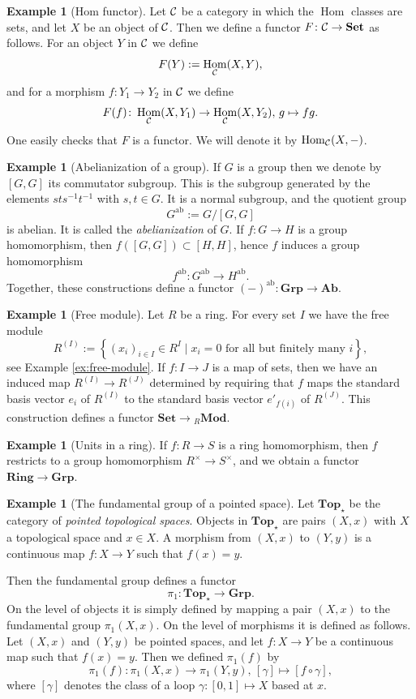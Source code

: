 \documentclass[11pt]{amsbook}
\renewcommand{\ast}{\star}
\DeclareMathOperator\Hom{Hom}
\DeclareMathOperator\Mod{{\bf{Mod}}}
\def\ab{\mathrm{ab}}
\def\Set{\mathbf{Set}}
\def\Ab{\mathbf{Ab}}
\def\Top{\mathbf{Top}}
\def\Grp{\mathbf{Grp}}
\def\Ring{\mathbf{Ring}}
\def\Mod{\mathbf{Mod}}
\theoremstyle{plain}
\theoremstyle{definition}
\newtheorem{example}[theorem]{Example}
\begin{document}
\begin{example}[Hom functor]\label{exa:covariant-hom-functor}
Let ${\mathcal{C}}$ be a category in which the $\Hom$ classes are sets, and let $X$ be an object of ${\mathcal{C}}$. Then we define a functor $F\colon \cC\to \Set$ as follows. For an object $Y$ in ${\mathcal{C}}$ we define
\[
	F(Y) := \Hom_\cC(X,Y),
\]
and for a morphism $f\colon Y_1 \to Y_2$ in ${\mathcal{C}}$ we define
\[
	F(f) \colon \Hom_\cC(X,Y_1) \to \Hom_\cC(X,Y_2),\, g \mapsto fg.
\]
One easily checks that $F$ is a functor. We  will denote it by $\Hom_\cC(X,-)$.
\end{example}


\begin{example}[Abelianization of a group]\label{exa:abelianization}
If $G$ is a group then we denote by $[G,G]$ its commutator subgroup. This is the subgroup generated by the elements $sts^{-1}t^{-1}$ with $s,t\in G$. It is a normal subgroup, and the quotient group
\[
	G^{\ab} := G/[G,G]
\]
is abelian. It is called the \emph{abelianization} of $G$. If $f\colon G\to H$ is a group homomorphism, then $f([G,G]) \subset [H,H]$,  hence $f$ induces a group homomorphism 
\[
	f^\ab \colon G^\ab \to H^\ab.
\]
Together, these constructions define a functor $(-)^\ab\colon \Grp\to\Ab$.
\end{example}

\begin{example}[Free module]\label{exa:free-module-functor}
Let $R$ be a ring. For every set $I$ we have the free module 
\[
	R^{(I)} := \left\{ (x_i)_{i\in I} \in R^I \mid \text{$x_i=0$ for all but finitely many $i$} \right\},
\]
see Example \ref{ex:free-module}. If $f\colon I\to J$ is a map of sets, then we have an induced map
$R^{(I)} \to R^{(J)}$ 
determined by requiring that $f$ maps the standard basis vector $e_i$ of $R^{(I)}$ to the standard basis vector $e'_{f(i)}$ of $R^{(J)}$. This construction defines a functor $\Set \to {}_R\Mod$.
\end{example}

\begin{example}[Units in a ring]
If $f\colon R\to S$ is a ring homomorphism, then $f$ restricts to a group homomorphism $R^\times \to S^\times$, and we obtain a functor $\Ring \to \Grp$.
\end{example}

\begin{example}[The fundamental group of a pointed space] Let $\Top_\ast$ be the category of \emph{pointed topological spaces}. Objects in $\Top_\ast$ are pairs $(X,x)$ with $X$ a topological space and $x\in X$. A morphism from $(X,x)$ to $(Y,y)$ is a continuous map $f\colon X\to Y$ such that $f(x)=y$.

Then the fundamental group defines a functor
\[
	\pi_1\colon \Top_\ast \to \Grp.
\]
On the level of objects it is simply defined by mapping a pair $(X,x)$ to the fundamental group $\pi_1(X,x)$. On the level of morphisms
it is defined as follows. Let $(X,x)$ and $(Y,y)$ be pointed spaces, and let $f \colon X\to Y$ be a continuous map such that $f(x)=y$. Then
we defined $\pi_1(f)$ by
\[
	\pi_1(f) \colon \pi_1(X,x) \to \pi_1(Y,y),\, [\gamma] \mapsto [f\circ \gamma],
\]
where $[\gamma]$ denotes the class of a loop $\gamma\colon [0,1] \mapsto X$ based at $x$.
\end{example} 
\end{document}
